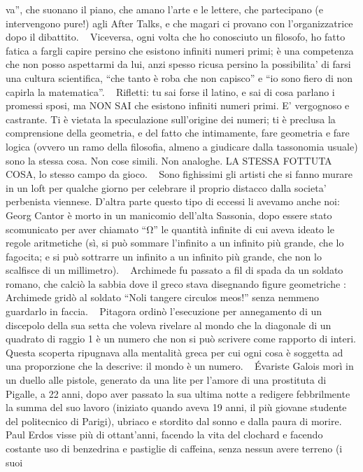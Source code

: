 va'', che suonano il piano, che amano l'arte e le lettere, che
partecipano (e intervengono pure!) agli After Talks, e che magari ci
provano con l'organizzatrice dopo il dibattito. ~ Viceversa, ogni volta
che ho conosciuto un filosofo, ho fatto fatica a fargli capire persino
che esistono infiniti numeri primi; è una competenza che non posso
aspettarmi da lui, anzi spesso ricusa persino la possibilita' di farsi
una cultura scientifica, ``che tanto è roba che non capisco'' e ``io
sono fiero di non capirla la matematica''. ~ Rifletti: tu sai forse il
latino, e sai di cosa parlano i promessi sposi, ma NON SAI che esistono
infiniti numeri primi. E' vergognoso e castrante. Ti è vietata la
speculazione sull'origine dei numeri; ti è preclusa la comprensione
della geometria, e del fatto che intimamente, fare geometria e fare
logica (ovvero un ramo della filosofia, almeno a giudicare dalla
tassonomia usuale) sono la stessa cosa. Non cose simili. Non analoghe.
LA STESSA FOTTUTA COSA, lo stesso campo da gioco. ~ Sono fighissimi gli
artisti che si fanno murare in un loft per qualche giorno per celebrare
il proprio distacco dalla societa' perbenista viennese. D'altra parte
questo tipo di eccessi li avevamo anche noi: ~ Georg Cantor è morto in
un manicomio dell'alta Sassonia, dopo essere stato scomunicato per aver
chiamato ``Ω'' le quantità infinite di cui aveva ideato le regole
aritmetiche (sì, si può sommare l'infinito a un infinito più grande, che
lo fagocita; e si può sottrarre un infinito a un infinito più grande,
che non lo scalfisce di un millimetro). ~ Archimede fu passato a fil di
spada da un soldato romano, che calciò la sabbia dove il greco stava
disegnando figure geometriche : Archimede gridò al soldato ``Noli
tangere circulos meos!'' senza nemmeno guardarlo in faccia. ~ Pitagora
ordinò l'esecuzione per annegamento di un discepolo della sua setta che
voleva rivelare al mondo che la diagonale di un quadrato di raggio 1 è
un numero che non si può scrivere come rapporto di interi. Questa
scoperta ripugnava alla mentalità greca per cui ogni cosa è soggetta ad
una proporzione che la descrive: il mondo è un numero. ~ Évariste Galois
morì in un duello alle pistole, generato da una lite per l'amore di una
prostituta di Pigalle, a 22 anni, dopo aver passato la sua ultima notte
a redigere febbrilmente la summa del suo lavoro (iniziato quando aveva
19 anni, il più giovane studente del politecnico di Parigi), ubriaco e
stordito dal sonno e dalla paura di morire. ~ Paul Erdos visse più di
ottant'anni, facendo la vita del clochard e facendo costante uso di
benzedrina e pastiglie di caffeina, senza nessun avere terreno (i suoi
